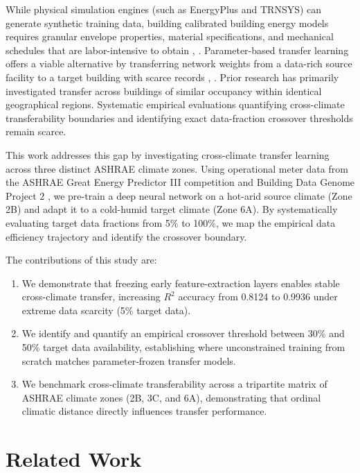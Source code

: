 \documentclass[conference]{IEEEtran}
\begin{document}
While physical simulation engines (such as EnergyPlus and TRNSYS) can generate synthetic training data, building calibrated building energy models requires granular envelope properties, material specifications, and mechanical schedules that are labor-intensive to obtain \cite{b7}, \cite{b8}. Parameter-based transfer learning offers a viable alternative by transferring network weights from a data-rich source facility to a target building with scarce records \cite{b3}, \cite{b12}. Prior research has primarily investigated transfer across buildings of similar occupancy within identical geographical regions. Systematic empirical evaluations quantifying cross-climate transferability boundaries and identifying exact data-fraction crossover thresholds remain scarce.

This work addresses this gap by investigating cross-climate transfer learning across three distinct ASHRAE climate zones. Using operational meter data from the ASHRAE Great Energy Predictor III competition \cite{b1} and Building Data Genome Project 2 \cite{b2}, we pre-train a deep neural network on a hot-arid source climate (Zone 2B) and adapt it to a cold-humid target climate (Zone 6A). By systematically evaluating target data fractions from 5\% to 100\%, we map the empirical data efficiency trajectory and identify the crossover boundary.

The contributions of this study are:
\begin{enumerate}
    \item We demonstrate that freezing early feature-extraction layers enables stable cross-climate transfer, increasing $R^2$ accuracy from 0.8124 to 0.9936 under extreme data scarcity (5\% target data).
    \item We identify and quantify an empirical crossover threshold between 30\% and 50\% target data availability, establishing where unconstrained training from scratch matches parameter-frozen transfer models.
    \item We benchmark cross-climate transferability across a tripartite matrix of ASHRAE climate zones (2B, 3C, and 6A), demonstrating that ordinal climatic distance directly influences transfer performance.
\end{enumerate}

\section{Related Work}
\end{document}
